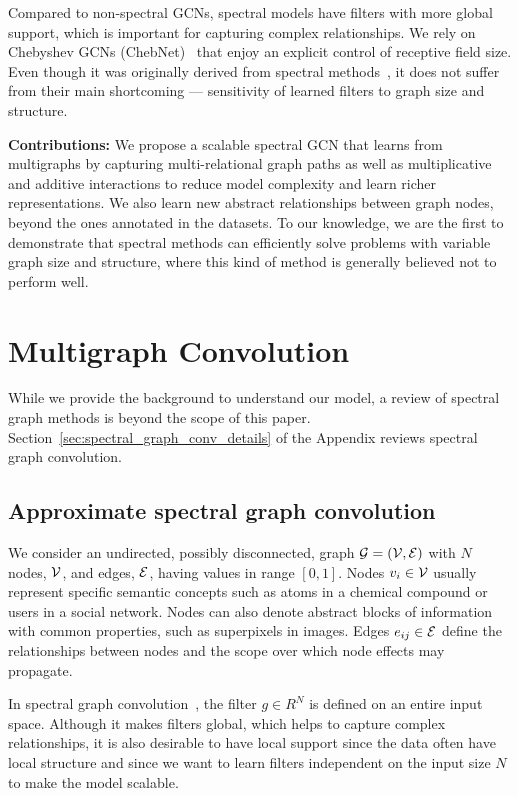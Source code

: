 \documentclass[final,nonatbib]{article} \usepackage{nips_2018}
\begin{document}
	Compared to non-spectral GCNs, spectral models have filters with more global support, which is important for capturing complex relationships. We rely on Chebyshev GCNs (ChebNet)~\cite{defferrard2016convolutional} that enjoy an explicit control of receptive
	field size. Even though it was originally derived from spectral methods~\cite{bruna2013spectral}, it does not suffer from their main shortcoming --- sensitivity of learned filters to graph size and structure.

	\textbf{Contributions:} We propose a scalable spectral GCN that learns from multigraphs by capturing multi-relational graph paths as well as multiplicative and additive interactions to reduce model complexity and learn richer representations. We also learn new abstract relationships between graph nodes, beyond the ones annotated in the datasets. To our knowledge, we are the first to demonstrate that spectral methods can efficiently solve problems with variable graph size and structure, where this kind of method is generally believed not to perform well.

	\section{Multigraph Convolution}\label{sec:multigraph}
	While we provide the background to understand our model, a review of spectral graph methods is beyond the scope of this paper. Section~\ref{sec:spectral_graph_conv_details} of the Appendix reviews spectral graph convolution.
\subsection{Approximate spectral graph convolution}
\label{sec:spectral_graph_conv}
We consider an undirected, possibly disconnected, graph $\cal G =(V, E)$ with $N$ nodes, $\cal V$, and edges, $\cal E$, having values in range $[0, 1]$. Nodes $v_i \in \cal V$ usually represent specific semantic concepts such as atoms in a chemical compound or users in a social network. Nodes can also denote abstract blocks of information with common properties, such as superpixels in images. Edges $e_{ij} \in \cal E$ define the relationships between nodes and the scope over which node effects may propagate.

	In spectral graph convolution~\cite{bruna2013spectral}, the filter $g \in R^N$ is defined on an entire input space.
	Although it makes filters global, which helps to capture complex relationships, it is also desirable to have local support since the data often have local structure and since we want to learn filters independent on the input size $N$ to make the model scalable.
\end{document}

